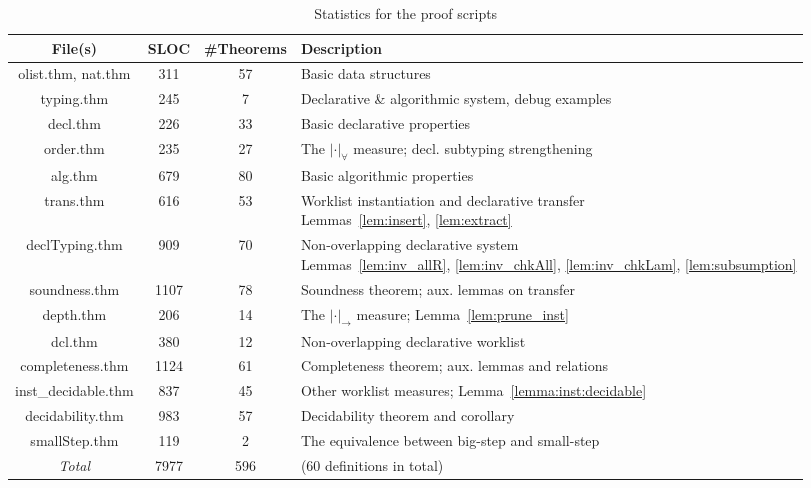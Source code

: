 \begin{table}[t]
\caption{Statistics for the proof scripts}
\centering\begin{tabular}{|c|c|c|l|}\hline
    File(s) & SLOC & \#Theorems & Description\\\hline
    olist.thm, nat.thm  &  311 & 57  & Basic data structures\\\hline
    typing.thm          &  245 & 7   & Declarative \& algorithmic system, debug examples\\\hline
    decl.thm            &  226 & 33  & Basic declarative properties\\\hline
    order.thm           &  235 & 27  & The $|\cdot|_\forall$ measure; decl. subtyping strengthening\\\hline
    alg.thm             &  679 & 80  & Basic algorithmic properties\\\hline
    trans.thm           &  616 & 53  & \makecell[l]{Worklist instantiation and declarative transfer\\
                            Lemmas~\ref{lem:insert}, \ref{lem:extract}}\\\hline
    declTyping.thm      &  909 & 70  & \makecell[l]{Non-overlapping declarative system \\
                            Lemmas~\ref{lem:inv_allR}, \ref{lem:inv_chkAll},
                                \ref{lem:inv_chkLam}, \ref{lem:subsumption}}\\\hline
    soundness.thm       & 1107 & 78  & Soundness theorem; aux. lemmas on transfer\\\hline
    depth.thm           &  206 & 14  & The $|\cdot|_\to$ measure; Lemma~\ref{lem:prune_inst}\\\hline
    dcl.thm             &  380 & 12  & Non-overlapping declarative worklist \\\hline
    completeness.thm    & 1124 & 61  &
                            Completeness theorem; aux. lemmas and relations\\\hline
    inst\_decidable.thm &  837 & 45  & Other worklist measures; Lemma~\ref{lemma:inst:decidable}\\\hline
    decidability.thm    &  983 & 57  & Decidability theorem and corollary\\\hline
    smallStep.thm       &  119 &  2  & The equivalence between big-step and small-step\\\hline
    \hline\emph{Total}               & 7977 & 596 & (60 definitions in total)\\\hline
\end{tabular}
\label{table:proof_statistics}
\end{table}
